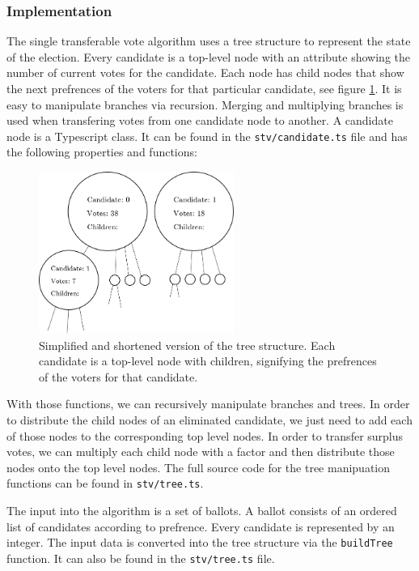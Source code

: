 \documentclass[12pt]{article}
\begin{document}
\subsubsection{Implementation}
The single transferable vote algorithm uses a tree structure to represent the state of the election. Every candidate is a top-level node with an attribute showing the number of current votes for the candidate. Each node has child nodes that show the next prefrences of the voters for that particular candidate, see figure \ref{Tree structure}. It is easy to manipulate branches via recursion. Merging and multiplying branches is used when transfering votes from one candidate node to another. A candidate node is a Typescript class. It can be found in the \texttt{stv/candidate.ts} file and has the following properties and functions:
%
\begin{figure}[H]
	\centering
	\includegraphics[height=200px]{Tree}
	\caption{Simplified and shortened version of the tree structure. Each candidate is a top-level node with children, signifying the prefrences of the voters for that candidate.}
	\label{Tree structure}
\end{figure}
With those functions, we can recursively manipulate branches and trees. In order to distribute the child nodes of an eliminated candidate, we just need to add each of those nodes to the corresponding top level nodes. In order to transfer surplus votes, we can multiply each child node with a factor and then distribute those nodes onto the top level nodes. The full source code for the tree manipuation functions can be found in \texttt{stv/tree.ts}.

The input into the algorithm is a set of ballots. A ballot consists of an ordered list of candidates according to prefrence. Every candidate is represented by an integer. The input data is converted into the tree structure via the \texttt{buildTree} function. It can also be found in the \texttt{stv/tree.ts} file.
\end{document}
